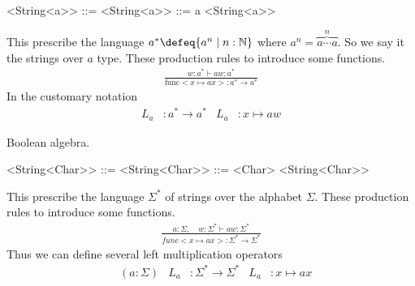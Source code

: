 \begin{example}
\begin{center}
\begin{Gcode}[]
<String<a>> ::= 
<String<a>> ::= a <String<a>>
\end{Gcode}
\end{center}
This prescribe the language $a^*\defeq \{a^n\mid n:\mathbb{N}\}$ where 
$a^n=\overbrace{a\cdots a}^n$. So we say it the strings over $a$ type.
These production rules to introduce some functions.
\begin{gather*}
    \frac{
        w:a^*\vdash aw:a^*
    }{
        \text{func}<x\mapsto ax>:a^*\to a^*
    }
\end{gather*}
In the customary notation
\begin{align*}
    L_a &:a^*\to a^* 
    &
    L_a& : x\mapsto aw
\end{align*}
\end{example}


\begin{example}
Boolean algebra.
\begin{center}
\begin{Gcode}[]
<String<Char>> ::= 
<String<Char>> ::= <Char> <String<Char>>
\end{Gcode}
\end{center}
This prescribe the language $\Sigma^*$ of strings over the alphabet $\Sigma$.
These production rules to introduce some functions.
\begin{gather*}
    \frac{
        a:\Sigma, \quad w:\Sigma^*\vdash aw:\Sigma^*
    }{
        func<x\mapsto ax>:\Sigma^*\to \Sigma^*
    }
\end{gather*}
Thus we can define several left multiplication operators
\begin{align*}
    & (a:\Sigma)
    &
    L_a &:\Sigma^*\to \Sigma^* 
    &
    L_a &: x\mapsto ax
\end{align*}
\end{example}


